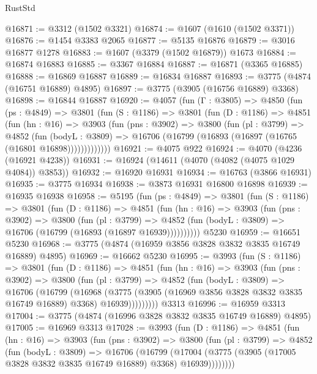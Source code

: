 \begin{lexlean}{RustStd}
\begin{coremodule}
{\begin{coremodule}
{{{{{{{{{{{{{{{{{{{{{{{{{{{{{{{@16871 := @3312 (@1502 @3321)
@16874 := @1607 (@1610 (@1502 @3371))
@16876 := @1454 @3383 @2065
@16877 := @5135 @16876
@16879 := @3016 @16877 @1278
@16883 := @1607 (@3379 (@1502 @16879)) @1673
@16884 := @16874 @16883
@16885 := @3367 @16884
@16887 := @16871 (@3365 @16885)
@16888 := @16869 @16887
@16889 := @16834 @16887
@16893 := @3775 (@4874 (@16751 @16889) @4895)
@16897 := @3775 (@3905 (@16756 @16889) @3368)
@16898 := @16844 @16887
@16920 := @4057
    (fun (Γ : @3805) =>
    @4850
      (fun (ps : @4849) =>
      @3801
        (fun (S : @1186) =>
        @3801
          (fun (D : @1186) =>
          @4851
            (fun (hn : @16) =>
            @3903
              (fun (pns : @3902) =>
              @3800
                (fun (pl : @3799) =>
                @4852
                  (fun (bodyL : @3809) =>
                  @16706 (@16799 (@16893 (@16897 (@16765 (@16801 @16898)))))))))))))
@16921 := @4075 @922
@16924 := @4070 (@4236 (@16921 @4238))
@16931 := @16924 (@14611 (@4070 (@4082 (@4075 @1029 @4084)) @3853))
@16932 := @16920 @16931
@16934 := @16763 (@3866 @16931)
@16935 := @3775 @16934
@16938 := @3873 @16931 @16800 @16898
@16939 := @16935 @16938
@16958 := @5195
    (fun (ps : @4849) =>
    @3801
      (fun (S : @1186) =>
      @3801
        (fun (D : @1186) =>
        @4851
          (fun (hn : @16) =>
          @3903
            (fun (pns : @3902) =>
            @3800
              (fun (pl : @3799) =>
              @4852 (fun (bodyL : @3809) => @16706 (@16799 (@16893 (@16897 @16939))))))))))
    @5230
@16959 := @16651 @5230
@16968 := @3775 (@4874 (@16959 @3856 @3828 @3832 @3835 @16749 @16889) @4895)
@16969 := @16662 @5230
@16995 := @3993
    (fun (S : @1186) =>
    @3801
      (fun (D : @1186) =>
      @4851
        (fun (hn : @16) =>
        @3903
          (fun (pns : @3902) =>
          @3800
            (fun (pl : @3799) =>
            @4852
              (fun (bodyL : @3809) =>
              @16706
                (@16799
                  (@16968
                    (@3775
                      (@3905 (@16969 @3856 @3828 @3832 @3835 @16749 @16889) @3368)
                      @16939)))))))))
    @3313
@16996 := @16959 @3313
@17004 := @3775 (@4874 (@16996 @3828 @3832 @3835 @16749 @16889) @4895)
@17005 := @16969 @3313
@17028 := @3993
    (fun (D : @1186) =>
    @4851
      (fun (hn : @16) =>
      @3903
        (fun (pns : @3902) =>
        @3800
          (fun (pl : @3799) =>
          @4852
            (fun (bodyL : @3809) =>
            @16706
              (@16799
                (@17004 (@3775 (@3905 (@17005 @3828 @3832 @3835 @16749 @16889) @3368) @16939))))))))
}}}}}}}}}}}}}}}}}}}}}}}}}}}}}}}
\end{coremodule}}
\end{coremodule}
\end{lexlean}
